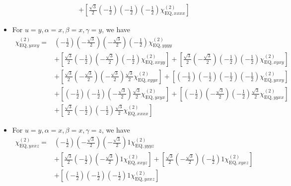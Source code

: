 \documentclass[UTF8,10pt,a4paper]{article}
\begin{document}
\begin{itemize}
\begin{align}
&+\left[\frac{\sqrt{3}}{2}\left(-\frac{1}{2}\right)\left(-\frac{1}{2}\right)\left(-\frac{1}{2}\right)\chi_{\text{EQ},xxxx}^{(2)}\right]
\end{align}\normalsize
\item For $u=y,\alpha=x,\beta=x,\gamma=y$, we have
\footnotesize\begin{align}
\nonumber\chi_{\text{EQ},yxxy}^{(2)}=&\left(-\frac{1}{2}\right)\left(-\frac{\sqrt{3}}{2}\right)\left(-\frac{\sqrt{3}}{2}\right)\left(-\frac{1}{2}\right)\chi_{\text{EQ},yyyy}^{(2)}\\
\nonumber&+\left[\frac{\sqrt{3}}{2}\left(-\frac{1}{2}\right)\left(-\frac{\sqrt{3}}{2}\right)\left(-\frac{1}{2}\right)\chi_{\text{EQ},xxyy}^{(2)}\right]+\left[\frac{\sqrt{3}}{2}\left(-\frac{\sqrt{3}}{2}\right)\left(-\frac{1}{2}\right)\left(-\frac{1}{2}\right)\chi_{\text{EQ},xyxy}^{(2)}\right]\\
\nonumber&+\left[\frac{\sqrt{3}}{2}\left(-\frac{\sqrt{3}}{2}\right)\left(-\frac{\sqrt{3}}{2}\right)\frac{\sqrt{3}}{2}\chi_{\text{EQ},xyyx}^{(2)}\right]+\left[\left(-\frac{1}{2}\right)\left(-\frac{1}{2}\right)\left(-\frac{1}{2}\right)\left(-\frac{1}{2}\right)\chi_{\text{EQ},yxxy}^{(2)}\right]\\
\nonumber&+\left[\left(-\frac{1}{2}\right)\left(-\frac{1}{2}\right)\left(-\frac{\sqrt{3}}{2}\right)\frac{\sqrt{3}}{2}\chi_{\text{EQ},yxyx}^{(2)}\right]+\left[\left(-\frac{1}{2}\right)\left(-\frac{\sqrt{3}}{2}\right)\left(-\frac{1}{2}\right)\frac{\sqrt{3}}{2}\chi_{\text{EQ},yyxx}^{(2)}\right]\\
&+\left[\frac{\sqrt{3}}{2}\left(-\frac{1}{2}\right)\left(-\frac{1}{2}\right)\frac{\sqrt{3}}{2}\chi_{\text{EQ},xxxx}^{(2)}\right]
\end{align}\normalsize
\item For $u=y,\alpha=x,\beta=x,\gamma=z$, we have
\footnotesize\begin{align}
\nonumber\chi_{\text{EQ},yxxz}^{(2)}=&\left(-\frac{1}{2}\right)\left(-\frac{\sqrt{3}}{2}\right)\left(-\frac{\sqrt{3}}{2}\right)1\chi_{\text{EQ},yyyz}^{(2)}\\
\nonumber&+\left[\frac{\sqrt{3}}{2}\left(-\frac{1}{2}\right)\left(-\frac{\sqrt{3}}{2}\right)1\chi_{\text{EQ},xxyz}^{(2)}\right]+\left[\frac{\sqrt{3}}{2}\left(-\frac{\sqrt{3}}{2}\right)\left(-\frac{1}{2}\right)1\chi_{\text{EQ},xyxz}^{(2)}\right]\\
\nonumber&+\left[\left(-\frac{1}{2}\right)\left(-\frac{1}{2}\right)\left(-\frac{1}{2}\right)1\chi_{\text{EQ},yxxz}^{(2)}\right]\\
\nonumber&\\

\end{align}
\end{itemize}
\end{document}
